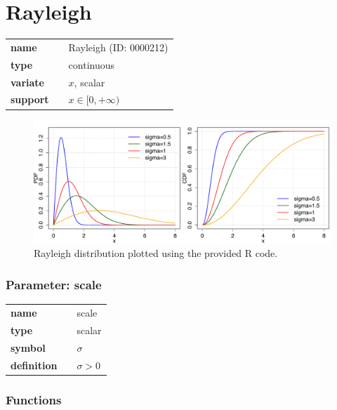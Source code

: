 \section*{Rayleigh} 

  \bigskip 

\begin{tabular}{p{2cm}cl}
\textbf{name} & & Rayleigh (ID: 0000212)\\ 
 
\textbf{type} & & continuous \\ 

\textbf{variate} & & $x$, scalar \\ 

\textbf{support} & & $x \in [0,+\infty)$
\end{tabular}

\begin{figure}[ht!]
\centering
  \includegraphics[width=140mm]{pics/Rayleigh.pdf}
 \caption{Rayleigh distribution plotted using the provided R code.}
 \label{fig:Rayleigh}
\end{figure}

\subsubsection*{Parameter: scale}

\noindent\begin{tabular}{p{2cm}cl}
\textbf{name} & & scale \\
\textbf{type} & & scalar \\
\textbf{symbol} & & $\sigma$  \\
\textbf{definition} & & $\sigma > 0$
\end{tabular}
\subsubsection*{Functions}

